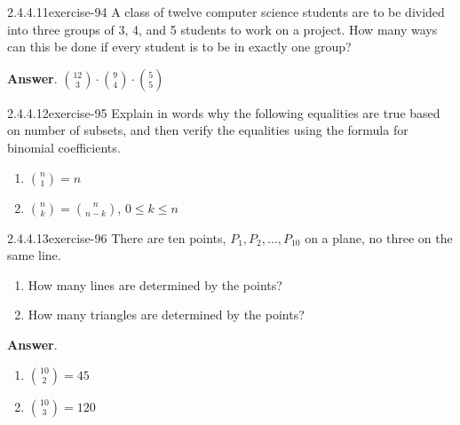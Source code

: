 \documentclass[twoside,10pt,]{book}
\numberwithin{equation}{section}
\begin{document}
\begin{divisionsolution}{2.4.4.11}{}{exercise-94}%
\hypertarget{p-830}{}%
A class of twelve computer science students are to be divided into three groups of 3, 4, and 5 students to work on a project. How many ways can this be done if every student is to be in exactly one group?%
\par\smallskip%
\noindent\textbf{Answer}.\quad%
\hypertarget{p-831}{}%
\(\binom{12}{3}\cdot\binom{9}{4}\cdot\binom{5}{5}\)%
\end{divisionsolution}%
\begin{divisionsolution}{2.4.4.12}{}{exercise-95}%
\hypertarget{p-832}{}%
Explain in words why the following equalities are true based on number of subsets,  and then verify the equalities using the formula for binomial coefficients.%
\par
\hypertarget{p-833}{}%
\leavevmode%
\begin{enumerate}[label=(\alph*)]
\item\hypertarget{li-467}{}\hypertarget{p-834}{}%
\(\binom{n}{1} = n\)%
\item\hypertarget{li-468}{}\hypertarget{p-835}{}%
\(\binom{n}{k} = \binom{n}{n-k}\), \(0 \leq k \leq n\)%
\end{enumerate}
%
\end{divisionsolution}%
\begin{divisionsolution}{2.4.4.13}{}{exercise-96}%
\hypertarget{p-836}{}%
There are ten points, \(P_1, P_2, \dots , P_{10}\) on a plane, no three on the same line.%
\par
\hypertarget{p-837}{}%
\leavevmode%
\begin{enumerate}[label=(\alph*)]
\item\hypertarget{li-469}{}\hypertarget{p-838}{}%
How many lines are determined by the points?%
\item\hypertarget{li-470}{}\hypertarget{p-839}{}%
How many triangles are determined by the points?%
\end{enumerate}
%
\par\smallskip%
\noindent\textbf{Answer}.\quad%
\hypertarget{p-840}{}%
\leavevmode%
\begin{enumerate}[label=(\alph*)]
\item\hypertarget{li-471}{}\(\binom{10}{2}=45\)%
\item\hypertarget{li-472}{}\(\binom{10}{3}=120\)%
\end{enumerate}
%
\end{divisionsolution}%
\end{document}
